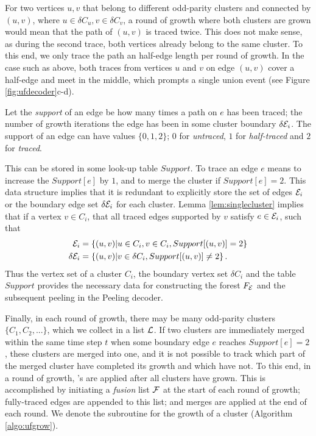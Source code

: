 For two vertices $u,v$ that belong to different odd-parity clusters and connected by $(u,v)$, where $u \in \delta C_u, v \in \delta C_v$, a round of growth where both clusters are grown would mean that the path of $(u,v)$ is traced twice. This does not make sense, as during the second trace, both vertices already belong to the same cluster. To this end, we only trace the path an half-edge length per round of growth. In the case such as above, both traces from vertices $u$ and $v$ on edge $(u,v)$ cover a half-edge and meet in the middle, which prompts a single union event (see Figure \ref{fig:ufdecoder}c-d). 
\begin{definition}\label{def:support}
  Let the \emph{support} of an edge be how many times a path on $e$ has been traced; the number of growth iterations the edge has been in some cluster boundary $\delta\mathcal{E}_i$. The support of an edge can have values $\{0,1,2\}$; $0$ for \emph{untraced}, $1$ for \emph{half-traced} and $2$ for \emph{traced}.
\end{definition}
This can be stored in some look-up table $Support$. To trace an edge $e$ means to increase the $Support[e]$ by $1$, and to merge the cluster if $Support[e]=2$. This data structure implies that it is redundant to explicitly store the set of edges $\mathcal{E}_i$ or the boundary edge set $\delta \mathcal{E}_i$ for each cluster. Lemma \ref{lem:singlecluster} implies that if a vertex $v\in C_i$, that all traced edges supported by $v$ satisfy $e \in \mathcal{E}_i$, such that
\begin{align}
  \mathcal{E}_i &= \left\{(u,v)|u\in C_i, v \in C_i, Support[(u,v)]=2\right\}\\
  \delta \mathcal{E}_i &= \left\{(u,v)| v \in \delta C_i, Support[(u,v)] \neq 2\right\}.
\end{align}
Thus the vertex set of a cluster $C_i$, the boundary vertex set $\delta C_i$ and the table $Support$ provides the necessary data for constructing the forest $F_{\mathcal{E}}$ and the subsequent peeling in the Peeling decoder.

Finally, in each round of growth, there may be many odd-parity clusters $\{C_{1}, C_{2},...\}$, which we collect in a list $\mathcal{L}$. If two clusters are immediately merged within the same time step $t$ when some boundary edge $e$ reaches $Support[e]=2$, these clusters are merged into one, and it is not possible to track which part of the merged cluster have completed its growth and which have not. To this end, in a round of growth, 's are applied after all clusters have grown. This is accomplished by initiating a \emph{fusion} list $\mathcal{F}$ at the start of each round of growth; fully-traced edges are appended to this list; and merges are applied at the end of each round. We denote the subroutine for the growth of a cluster  (Algorithm \ref{algo:ufgrow}).


